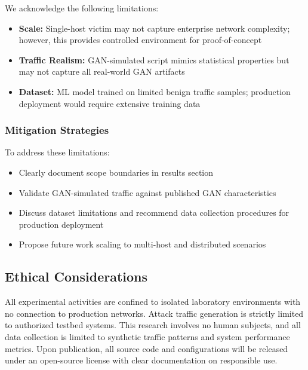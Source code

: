 We acknowledge the following limitations:

\begin{itemize}
    \item \textbf{Scale:} Single-host victim may not capture enterprise network complexity; however, this provides controlled environment for proof-of-concept
    \item \textbf{Traffic Realism:} GAN-simulated script mimics statistical properties but may not capture all real-world GAN artifacts
    \item \textbf{Dataset:} ML model trained on limited benign traffic samples; production deployment would require extensive training data
\end{itemize}

\subsubsection{Mitigation Strategies}

To address these limitations:

\begin{itemize}
    \item Clearly document scope boundaries in results section
    \item Validate GAN-simulated traffic against published GAN characteristics
    \item Discuss dataset limitations and recommend data collection procedures for production deployment
    \item Propose future work scaling to multi-host and distributed scenarios
\end{itemize}

\subsection{Ethical Considerations}

All experimental activities are confined to isolated laboratory environments with no connection to production networks. Attack traffic generation is strictly limited to authorized testbed systems. This research involves no human subjects, and all data collection is limited to synthetic traffic patterns and system performance metrics. Upon publication, all source code and configurations will be released under an open-source license with clear documentation on responsible use.